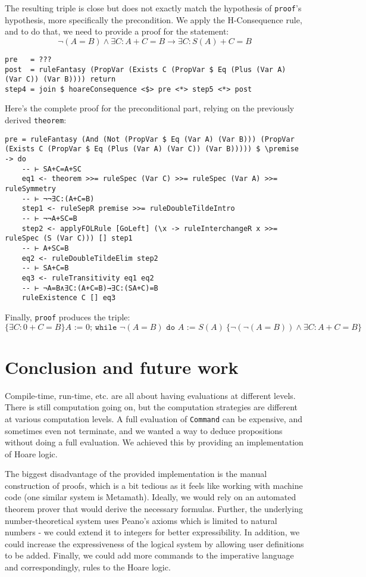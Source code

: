 \documentclass{article}
\begin{document}
The resulting triple is close but does not exactly match the hypothesis of \texttt{proof}'s hypothesis, more specifically the precondition. We apply the H-Consequence rule, and to do that, we need to provide a proof for the statement:
$$\neg (A = B) \land \exists C: A + C = B \to \exists C: S(A) + C = B$$

\begin{lstlisting}
pre   = ???
post  = ruleFantasy (PropVar (Exists C (PropVar $ Eq (Plus (Var A) (Var C)) (Var B)))) return
step4 = join $ hoareConsequence <$> pre <*> step5 <*> post
\end{lstlisting}

Here's the complete proof for the preconditional part, relying on the previously derived \texttt{theorem}:

\begin{lstlisting}
pre = ruleFantasy (And (Not (PropVar $ Eq (Var A) (Var B))) (PropVar (Exists C (PropVar $ Eq (Plus (Var A) (Var C)) (Var B))))) $ \premise -> do
    -- ⊢ SA+C=A+SC
    eq1 <- theorem >>= ruleSpec (Var C) >>= ruleSpec (Var A) >>= ruleSymmetry
    -- ⊢ ¬¬∃C:(A+C=B)
    step1 <- ruleSepR premise >>= ruleDoubleTildeIntro
    -- ⊢ ¬¬A+SC=B
    step2 <- applyFOLRule [GoLeft] (\x -> ruleInterchangeR x >>= ruleSpec (S (Var C))) [] step1
    -- ⊢ A+SC=B
    eq2 <- ruleDoubleTildeElim step2
    -- ⊢ SA+C=B
    eq3 <- ruleTransitivity eq1 eq2
    -- ⊢ ¬A=B∧∃C:(A+C=B)→∃C:(SA+C)=B
    ruleExistence C [] eq3
\end{lstlisting}

Finally, \texttt{proof} produces the triple:
$$\{\exists C: 0+C=B\} A \texttt{ := } 0 \texttt{; while } \neg(A = B) \texttt{ do }A\texttt{ := }S(A) \ \{\neg (\neg (A = B)) \land \exists C: A + C = B\}$$

\section{Conclusion and future work}

Compile-time, run-time, etc. are all about having evaluations at different levels. There is still computation going on, but the computation strategies are different at various computation levels. A full evaluation of \texttt{Command} can be expensive, and sometimes even not terminate, and we wanted a way to deduce propositions without doing a full evaluation. We achieved this by providing an implementation of Hoare logic.

The biggest disadvantage of the provided implementation is the manual construction of proofs, which is a bit tedious as it feels like working with machine code (one similar system is Metamath\cite{b9}). Ideally, we would rely on an automated theorem prover that would derive the necessary formulas. Further, the underlying number-theoretical system uses Peano's axioms which is limited to natural numbers - we could extend it to integers for better expressibility. In addition, we could increase the expressiveness of the logical system by allowing user definitions to be added. Finally, we could add more commands to the imperative language and correspondingly, rules to the Hoare logic.
\end{document}

